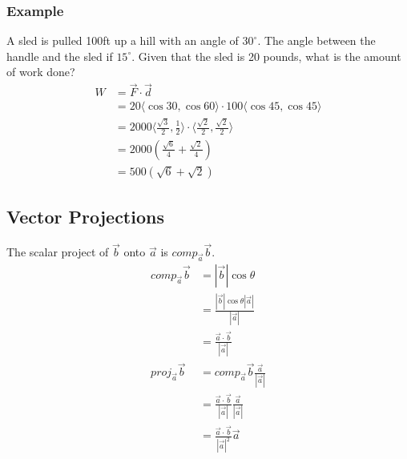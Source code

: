 \documentclass[letterpaper, 12pt]{math}
\begin{document}
\subsubsection*{Example}
A sled is pulled 100ft up a hill with an angle of \( 30^{\circ} \). The angle
between the handle and the sled if \( 15^{\circ} \). Given that the sled is 20
pounds, what is the amount of work done?
\begin{align*}
  W &= \vec{F}\cdot\vec{d} \\
  &= 20\langle\cos30,\cos60\rangle\cdot100\langle\cos45,\cos45\rangle \\
  &= 2000\langle\frac{\sqrt{3}}{2},\frac{1}{2}\rangle
    \cdot\langle\frac{\sqrt{2}}{2},\frac{\sqrt{2}}{2}\rangle \\
  &= 2000(\frac{\sqrt{6}}{4}+\frac{\sqrt{2}}{4}) \\
  &= 500(\sqrt{6}+\sqrt{2})
\end{align*}

\subsection*{Vector Projections}
\begin{center}
\end{center}
The scalar project of \( \vec{b} \) onto \( \vec{a} \) is
\( comp_{\vec{a}}\vec{b} \).
\begin{align*}
  comp_{\vec{a}}\vec{b} &= |\vec{b}|\cos\theta \\
  &= \frac{|\vec{b}|\cos\theta|\vec{a}|}{|\vec{a}|} \\
  &= \frac{\vec{a}\cdot\vec{b}}{|\vec{a}|} \\
  proj_{\vec{a}}\vec{b} &= comp_{\vec{a}}\vec{b}\frac{\vec{a}}{|\vec{a}|} \\
  &= \frac{\vec{a}\cdot\vec{b}}{|\vec{a}|}\frac{\vec{a}}{|\vec{a}|} \\
  &= \frac{\vec{a}\cdot\vec{b}}{|\vec{a}|^{2}}\vec{a}
\end{align*}
\end{document}
